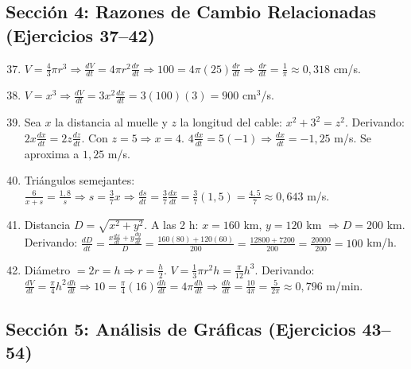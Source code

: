 \documentclass[12pt, a4paper]{article}
\begin{document}
\subsection*{Sección 4: Razones de Cambio Relacionadas (Ejercicios 37--42)}

\begin{enumerate}[leftmargin=*, label=\textbf{\arabic*.}]
  \setcounter{enumi}{36}
  \item $V = \frac{4}{3}\pi r^3 \Rightarrow \frac{dV}{dt} = 4\pi r^2 \frac{dr}{dt} \Rightarrow 100 = 4\pi(25)\frac{dr}{dt} \Rightarrow \frac{dr}{dt} = \frac{1}{\pi} \approx 0{,}318$ cm/s.
  \item $V = x^3 \Rightarrow \frac{dV}{dt} = 3x^2 \frac{dx}{dt} = 3(100)(3) = 900$ cm$^3$/s.
  \item Sea $x$ la distancia al muelle y $z$ la longitud del cable: $x^2 + 3^2 = z^2$. Derivando: $2x\frac{dx}{dt} = 2z\frac{dz}{dt}$. Con $z = 5 \Rightarrow x = 4$. $4\frac{dx}{dt} = 5(-1) \Rightarrow \frac{dx}{dt} = -1{,}25$ m/s. Se aproxima a $1{,}25$ m/s.
  \item Triángulos semejantes: $\frac{6}{x+s} = \frac{1{,}8}{s} \Rightarrow s = \frac{3}{7}x \Rightarrow \frac{ds}{dt} = \frac{3}{7}\frac{dx}{dt} = \frac{3}{7}(1{,}5) = \frac{4{,}5}{7} \approx 0{,}643$ m/s.
  \item Distancia $D = \sqrt{x^2 + y^2}$. A las 2 h: $x = 160$ km, $y = 120$ km $\Rightarrow D = 200$ km. Derivando: $\frac{dD}{dt} = \frac{x\frac{dx}{dt} + y\frac{dy}{dt}}{D} = \frac{160(80) + 120(60)}{200} = \frac{12800 + 7200}{200} = \frac{20000}{200} = 100$ km/h.
  \item Diámetro $= 2r = h \Rightarrow r = \frac{h}{2}$. $V = \frac{1}{3}\pi r^2 h = \frac{\pi}{12}h^3$. Derivando: $\frac{dV}{dt} = \frac{\pi}{4}h^2 \frac{dh}{dt} \Rightarrow 10 = \frac{\pi}{4}(16)\frac{dh}{dt} = 4\pi \frac{dh}{dt} \Rightarrow \frac{dh}{dt} = \frac{10}{4\pi} = \frac{5}{2\pi} \approx 0{,}796$ m/min.
\end{enumerate}

\subsection*{Sección 5: Análisis de Gráficas (Ejercicios 43--54)}
\end{document}
